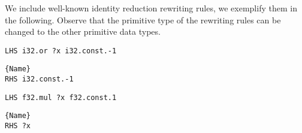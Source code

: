 We include well-known identity reduction rewriting rules, we exemplify them in the following.
Observe that the primitive type of the rewriting rules can be changed to the other primitive \Wasm data types. 

\begin{minipage}{0.95\linewidth}
\begin{minipage}{0.49\linewidth}
    
    \lstset{
    language=ttt,
    style=watcode,
    basicstyle=\footnotesize\ttfamily,
    columns=fullflexible,
    breaklines=true}
    \begin{lstlisting}[]
LHS i32.or ?x i32.const.-1
            \end{lstlisting}\vspace{-0.5cm}
    \noindent\hrulefill
        \lstset{
            language=ttt,
            style=watcode,
            basicstyle=\footnotesize\ttfamily,
            columns=fullflexible,
            breaklines=true}
            \vspace{-0.2cm}
            \begin{lstlisting}[numbers=none]{Name}
RHS i32.const.-1
    \end{lstlisting}
\end{minipage}
\begin{minipage}{0.49\linewidth}
    \lstset{
    language=ttt,
    style=watcode,
    basicstyle=\footnotesize\ttfamily,
    columns=fullflexible,
    breaklines=true}
    \begin{lstlisting}[]
LHS f32.mul ?x f32.const.1
            \end{lstlisting}\vspace{-0.5cm}
    \noindent\hrulefill
        \lstset{
            language=ttt,
            style=watcode,
            basicstyle=\footnotesize\ttfamily,
            columns=fullflexible,
            breaklines=true}
            \vspace{-0.2cm}
            \begin{lstlisting}[numbers=none]{Name}
RHS ?x
    \end{lstlisting}
\end{minipage}    
\end{minipage}


